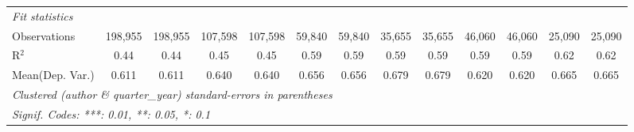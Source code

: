 \begin{tabular}{lcccccccccccc}
   \midrule
   \emph{Fit statistics}\\
   Observations                             & 198,955       & 198,955       & 107,598       & 107,598  & 59,840       & 59,840         & 35,655         & 35,655          & 46,060        & 46,060  & 25,090        & 25,090\\  
   R$^2$                                    & 0.44          & 0.44          & 0.45          & 0.45     & 0.59         & 0.59           & 0.59           & 0.59            & 0.59          & 0.59    & 0.62          & 0.62\\  
Mean(Dep. Var.) & 0.611 & 0.611 & 0.640 & 0.640 & 0.656 & 0.656 & 0.679 & 0.679 & 0.620 & 0.620 & 0.665 & 0.665 \\
   \midrule \midrule
   \multicolumn{13}{l}{\emph{Clustered (author \& quarter\_year) standard-errors in parentheses}}\\
   \multicolumn{13}{l}{\emph{Signif. Codes: ***: 0.01, **: 0.05, *: 0.1}}\\
\end{tabular}
\par\endgroup
